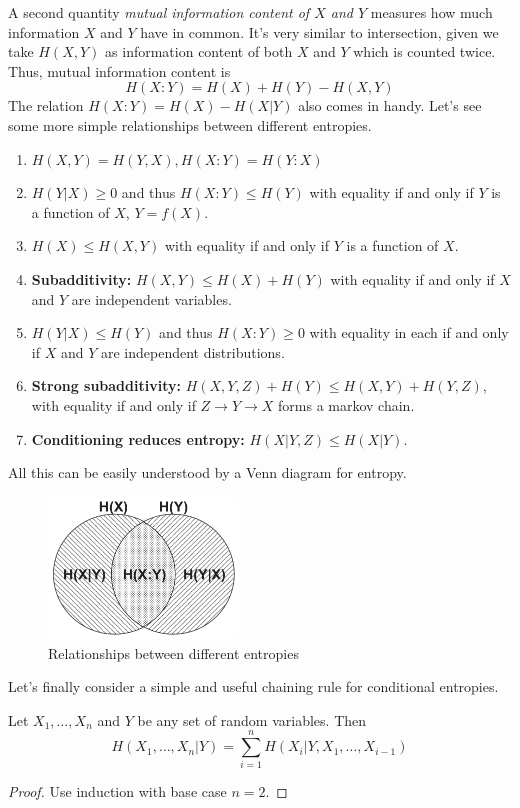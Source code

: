 A second quantity \textit{mutual information content of $X$ and $Y$} measures how much information $X$ and $Y$ have in common. It's very similar to intersection, given we take $H(X,Y)$ as information content of both $X$ and $Y$ which is counted twice. Thus, mutual information content is
\begin{equation}
    H(X:Y) = H(X) + H(Y) - H(X, Y)
\end{equation}
The relation $H(X:Y) = H(X) - H(X|Y)$ also comes in handy. Let's see some more simple relationships between different entropies.

\begin{ntheorem}
    \begin{enumerate}
        \item $H(X, Y) = H(Y, X), H(X:Y) = H(Y:X)$
        \item $H(Y|X) \geq 0$ and thus $H(X:Y)\leq H(Y)$ with equality if and only if $Y$ is a function of $X$, $Y=f(X)$.
        \item $H(X) \leq H(X,Y)$ with equality if and only if $Y$ is a function of $X$.
        \item \textbf{Subadditivity:} $H(X, Y) \leq H(X) + H(Y)$ with equality if and only if $X$ and $Y$ are independent variables.
        \item $H(Y|X) \leq H(Y)$ and thus $H(X:Y) \geq 0$ with equality in each if and only if $X$ and $Y$ are independent distributions.
        \item \textbf{Strong subadditivity:} $H(X,Y,Z) + H(Y) \leq H(X,Y) + H(Y, Z)$, with equality if and only if $Z\rightarrow Y\rightarrow X$ forms a markov chain.
        \item \textbf{Conditioning reduces entropy:} $H(X|Y,Z) \leq H(X|Y)$.
    \end{enumerate}
\end{ntheorem}
All this can be easily understood by a Venn diagram for entropy.
\begin{figure}[H]
    \centering
    \includegraphics[width=0.45\textwidth]{images/venn_entropy.png}
    \caption{Relationships between different entropies}
    \label{fig:venn-entropy}
\end{figure}
Let's finally consider a simple and useful chaining rule for conditional entropies.
\begin{theorem}
    Let $X_1,\dots,X_n$ and $Y$ be any set of random variables. Then
    \begin{equation}
        H(X_1,\dots,X_n|Y) = \sum_{i=1}^n H(X_i|Y,X_1,\dots,X_{i-1})
    \end{equation}
\end{theorem}
\begin{proof}
    Use induction with base case $n=2$.
\end{proof}

